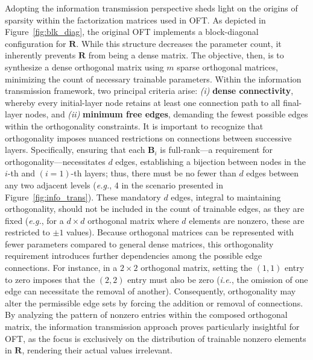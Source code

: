 Adopting the information transmission perspective sheds light on the origins of sparsity within the factorization matrices used in OFT. As depicted in Figure~\ref{fig:blk_diag}, the original OFT implements a block-diagonal configuration for $\bm{R}$. While this structure decreases the parameter count, it inherently prevents $\bm{R}$ from being a dense matrix. The objective, then, is to synthesize a dense orthogonal matrix using $m$ sparse orthogonal matrices, minimizing the count of necessary trainable parameters. Within the information transmission framework, two principal criteria arise: \emph{(i)} \textbf{dense connectivity}, whereby every initial-layer node retains at least one connection path to all final-layer nodes, and \emph{(ii)} \textbf{minimum free edges}, demanding the fewest possible edges within the orthogonality constraints. It is important to recognize that orthogonality imposes nuanced restrictions on connections between successive layers. Specifically, ensuring that each $\bm{B}_i$ is full-rank—a requirement for orthogonality—necessitates $d$ edges, establishing a bijection between nodes in the $i$-th and $(i=1)$-th layers; thus, there must be no fewer than $d$ edges between any two adjacent levels (\emph{e.g.}, 4 in the scenario presented in Figure~\ref{fig:info_trans}). These mandatory $d$ edges, integral to maintaining orthogonality, should not be included in the count of trainable edges, as they are fixed (\emph{e.g.}, for a $d\times d$ orthogonal matrix where $d$ elements are nonzero, these are restricted to $\pm 1$ values). Because orthogonal matrices can be represented with fewer parameters compared to general dense matrices, this orthogonality requirement introduces further dependencies among the possible edge connections. For instance, in a $2\times 2$ orthogonal matrix, setting the $(1,1)$ entry to zero imposes that the $(2,2)$ entry must also be zero (\emph{i.e.}, the omission of one edge can necessitate the removal of another). Consequently, orthogonality may alter the permissible edge sets by forcing the addition or removal of connections. By analyzing the pattern of nonzero entries within the composed orthogonal matrix, the information transmission approach proves particularly insightful for OFT, as the focus is exclusively on the distribution of trainable nonzero elements in $\bm{R}$, rendering their actual values irrelevant.

